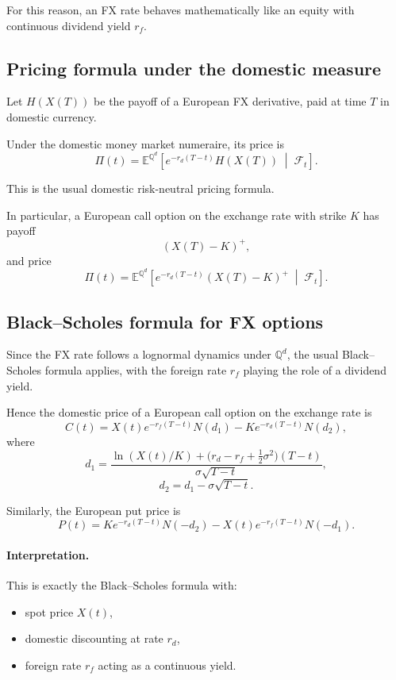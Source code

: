 \documentclass[11pt]{article}
\newcommand{\Qbb}{\mathbb{Q}}
\newcommand{\E}{\mathbb{E}}
\theoremstyle{definition}
\theoremstyle{plain}
\begin{document}
For this reason, an FX rate behaves mathematically like an equity with
continuous dividend yield \(r_f\).

\subsection{Pricing formula under the domestic measure}

Let \(H(X(T))\) be the payoff of a European FX derivative, paid at time
\(T\) in domestic currency.

Under the domestic money market numeraire, its price is
\[
\boxed{
\Pi(t)
=
\E^{\Qbb^d}\!\left[
e^{-r_d(T-t)}H(X(T))
\;\middle|\;
\mathcal{F}_t
\right].
}
\]

This is the usual domestic risk-neutral pricing formula.

In particular, a European call option on the exchange rate with strike
\(K\) has payoff
\[
(X(T)-K)^+,
\]
and price
\[
\Pi(t)
=
\E^{\Qbb^d}\!\left[
e^{-r_d(T-t)}(X(T)-K)^+
\;\middle|\;
\mathcal{F}_t
\right].
\]

\subsection{Black--Scholes formula for FX options}

Since the FX rate follows a lognormal dynamics under \(\Qbb^d\), the
usual Black--Scholes formula applies, with the foreign rate \(r_f\)
playing the role of a dividend yield.

Hence the domestic price of a European call option on the exchange rate
is
\[
\boxed{
C(t)
=
X(t)e^{-r_f(T-t)}N(d_1)
-
Ke^{-r_d(T-t)}N(d_2),
}
\]
where
\[
d_1
=
\frac{\ln(X(t)/K)+\big(r_d-r_f+\tfrac12\sigma^2\big)(T-t)}
{\sigma\sqrt{T-t}},
\]
\[
d_2=d_1-\sigma\sqrt{T-t}.
\]

Similarly, the European put price is
\[
\boxed{
P(t)
=
Ke^{-r_d(T-t)}N(-d_2)
-
X(t)e^{-r_f(T-t)}N(-d_1).
}
\]

\paragraph{Interpretation.}
This is exactly the Black--Scholes formula with:
\begin{itemize}[leftmargin=1.4em]
\item spot price \(X(t)\),
\item domestic discounting at rate \(r_d\),
\item foreign rate \(r_f\) acting as a continuous yield.
\end{itemize}
\end{document}
